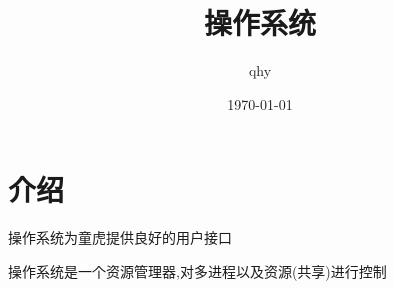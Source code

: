 \documentclass[UTF8,a4paper]{ctexart}
\author{ qhy }
\date{\today}
\title{操作系统}
\begin{document}
  \maketitle
  \tableofcontents
  \newpage

  \section{介绍}

  操作系统为童虎提供良好的用户接口

  操作系统是一个资源管理器,对多进程以及资源(共享)进行控制
\end{document}
